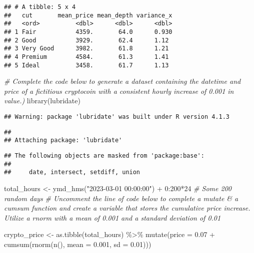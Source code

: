 \documentclass[
]{article}
\newenvironment{Shaded}{\begin{snugshade}}{\end{snugshade}}
\newcommand{\AttributeTok}[1]{\textcolor[rgb]{0.77,0.63,0.00}{#1}}
\newcommand{\CommentTok}[1]{\textcolor[rgb]{0.56,0.35,0.01}{\textit{#1}}}
\newcommand{\DecValTok}[1]{\textcolor[rgb]{0.00,0.00,0.81}{#1}}
\newcommand{\FloatTok}[1]{\textcolor[rgb]{0.00,0.00,0.81}{#1}}
\newcommand{\FunctionTok}[1]{\textcolor[rgb]{0.00,0.00,0.00}{#1}}
\newcommand{\NormalTok}[1]{#1}
\newcommand{\OtherTok}[1]{\textcolor[rgb]{0.56,0.35,0.01}{#1}}
\newcommand{\SpecialCharTok}[1]{\textcolor[rgb]{0.00,0.00,0.00}{#1}}
\newcommand{\StringTok}[1]{\textcolor[rgb]{0.31,0.60,0.02}{#1}}
\begin{document}
\begin{verbatim}
## # A tibble: 5 x 4
##   cut       mean_price mean_depth variance_x
##   <ord>          <dbl>      <dbl>      <dbl>
## 1 Fair           4359.       64.0      0.930
## 2 Good           3929.       62.4      1.12 
## 3 Very Good      3982.       61.8      1.21 
## 4 Premium        4584.       61.3      1.41 
## 5 Ideal          3458.       61.7      1.13
\end{verbatim}

\begin{Shaded}
\begin{Highlighting}[]
\CommentTok{\# Complete the code below to generate a dataset containing the datetime and price of a fictitious cryptocoin with a consistent hourly increase of 0.001 in value.)}
\FunctionTok{library}\NormalTok{(lubridate)}
\end{Highlighting}
\end{Shaded}

\begin{verbatim}
## Warning: package 'lubridate' was built under R version 4.1.3
\end{verbatim}

\begin{verbatim}
## 
## Attaching package: 'lubridate'
\end{verbatim}

\begin{verbatim}
## The following objects are masked from 'package:base':
## 
##     date, intersect, setdiff, union
\end{verbatim}

\begin{Shaded}
\begin{Highlighting}[]
\NormalTok{total\_hours }\OtherTok{\textless{}{-}} \FunctionTok{ymd\_hms}\NormalTok{(}\StringTok{"2023{-}03{-}01 00:00:00"}\NormalTok{) }\SpecialCharTok{+} \DecValTok{0}\SpecialCharTok{:}\DecValTok{200}\SpecialCharTok{*}\DecValTok{24} \CommentTok{\# Some 200 random days}
\CommentTok{\# Uncomment the line of code below to complete a mutate \& a cumsum function and create a variable that stores the cumulative price increase. Utilize a rnorm with a mean of 0.001 and a standard deviation of 0.01}

\NormalTok{crypto\_price }\OtherTok{\textless{}{-}} \FunctionTok{as.tibble}\NormalTok{(total\_hours) }\SpecialCharTok{\%\textgreater{}\%} 
  \FunctionTok{mutate}\NormalTok{(}\AttributeTok{price =} \FloatTok{0.07} \SpecialCharTok{+} \FunctionTok{cumsum}\NormalTok{(}\FunctionTok{rnorm}\NormalTok{(}\FunctionTok{n}\NormalTok{(), }\AttributeTok{mean =} \FloatTok{0.001}\NormalTok{, }\AttributeTok{sd =} \FloatTok{0.01}\NormalTok{)))}
\end{Highlighting}
\end{Shaded}
\end{document}
